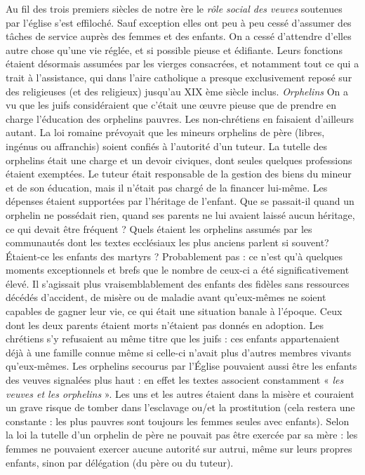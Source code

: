  Au fil des trois premiers siècles de notre ère le \emph{rôle social des veuves} soutenues par l'église s'est effiloché. Sauf exception elles ont peu à peu cessé d'assumer des tâches de service auprès des femmes et des enfants. On a cessé d'attendre d'elles autre chose qu'une vie réglée, et si possible pieuse et édifiante. Leurs fonctions étaient désormais assumées par les vierges consacrées, et notamment tout ce qui a trait à l'assistance, qui dans l'aire catholique a presque exclusivement reposé sur des religieuses (et des religieux) jusqu'au XIX ème siècle inclus. 
\emph{Orphelins
}On a vu que les juifs considéraient que c'était une œuvre pieuse que de prendre en charge l'éducation des orphelins pauvres. Les non-chrétiens en faisaient d'ailleurs autant. La loi romaine prévoyait que les mineurs orphelins de père (libres, ingénus ou affranchis) soient confiés à l'autorité d'un tuteur. La tutelle des orphelins était une charge et un devoir civiques, dont seules quelques professions étaient exemptées. Le tuteur était responsable de la gestion des biens du mineur et de son éducation, mais il n'était pas chargé de la financer lui-même. Les dépenses étaient supportées par l'héritage de l'enfant. Que se passait-il quand un orphelin ne possédait rien, quand ses parents ne lui avaient laissé aucun héritage, ce qui devait être fréquent ? 
 Quels étaient les orphelins assumés par les communautés dont les textes ecclésiaux les plus anciens parlent si souvent? Étaient-ce les enfants des martyrs ? Probablement pas : ce n'est qu'à quelques moments exceptionnels et brefs que le nombre de ceux-ci a été significativement élevé. Il s'agissait plus vraisemblablement des enfants des fidèles sans ressources décédés d'accident, de misère ou de maladie avant qu'eux-mêmes ne soient capables de gagner leur vie, ce qui était une situation banale à l'époque. Ceux dont les deux parents étaient morts n'étaient pas donnés en adoption. Les chrétiens s'y refusaient au même titre que les juifs : ces enfants appartenaient déjà à une famille connue même si celle-ci n'avait plus d'autres membres vivants qu'eux-mêmes. 
 Les orphelins secourus par l'Église pouvaient aussi être les enfants des veuves signalées plus haut : en effet les textes associent constamment « \emph{les veuves et les orphelins} ». Les uns et les autres étaient dans la misère et couraient un grave risque de tomber dans l'esclavage ou/et la prostitution (cela restera une constante : les plus pauvres sont toujours les femmes seules avec enfants). Selon la loi la tutelle d'un orphelin de père ne pouvait pas être exercée par sa mère : les femmes ne pouvaient exercer aucune autorité sur autrui, même sur leurs propres enfants, sinon par délégation (du père ou du tuteur).
